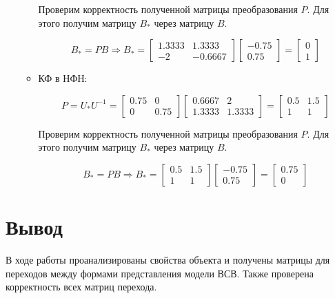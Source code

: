 \begin{itemize}
\begin{itemize}
	Проверим корректность полученной матрицы преобразования $P$. Для этого получим матрицу $B_{*}$ через матрицу $B$.
	
	\begin{equation*}
	\text{$B_{*}=PB$}
	\Longrightarrow
	\text{$B_{*}=
	\begin{bmatrix}1.3333  &  1.3333 \\
   -2  & -0.6667\end{bmatrix}
   \begin{bmatrix} -0.75 \\ 0.75 \end{bmatrix}
   =\begin{bmatrix} 0 \\ 1 \end{bmatrix}$}
	\end{equation*}
	

	
	\item КФ в НФН:
	
	\begin{equation*}
	\text{$P=U_{*}U^{-1}=
	\begin{bmatrix} 0.75 &         0 \\
         0  &  0.75 \end{bmatrix}
	\begin{bmatrix} 0.6667 &   2 \\
    1.3333  &  1.3333 \end{bmatrix}
=\begin{bmatrix}0.5 &  1.5 \\
    1  &  1\end{bmatrix}$}
	\end{equation*}
	
	Проверим корректность полученной матрицы преобразования $P$. Для этого получим матрицу $B_{*}$ через матрицу $B$.
	
	\begin{equation*}
	\text{$B_{*}=PB$}
	\Longrightarrow
	\text{$B_{*}=
\begin{bmatrix}0.5 &  1.5 \\
    1  &  1\end{bmatrix}
         \begin{bmatrix} -0.75 \\ 0.75 \end{bmatrix}
         =\begin{bmatrix} 0.75 \\ 0 \end{bmatrix}$}
	\end{equation*}
		
	\end{itemize}
\end{itemize}


\section{Вывод}

В ходе работы проанализированы свойства объекта и получены матрицы для переходов между
формами представления модели ВСВ. Также проверена корректность всех матриц перехода.
 
